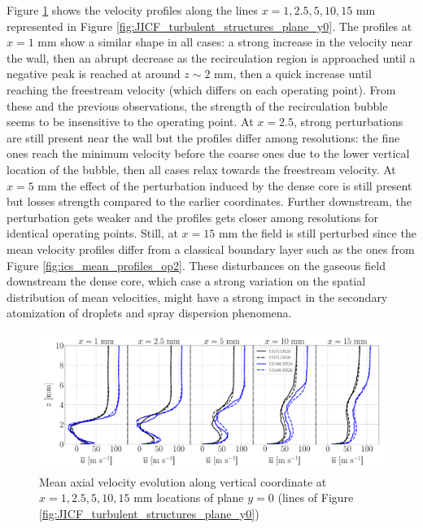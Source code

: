 Figure \ref{fig:JICF_sps_lines_y0_along_z_ux_mean} shows the velocity profiles along the lines $x = 1, 2.5, 5, 10, 15$ mm represented in Figure \ref{fig:JICF_turbulent_structures_plane_y0}. The profiles at $x = 1$ mm show a similar shape in all cases: a strong increase in the velocity near the wall, then an abrupt decrease as the recirculation region is approached until a negative peak is reached at around $z \sim 2$ mm, then a quick increase until reaching the freestream velocity (which differs on each operating point). From these and the previous observations, the strength of the recirculation bubble seems to be insensitive to the operating point. At $x = 2.5$, strong perturbations are still present near the wall but the profiles differ among resolutions: the fine ones reach the minimum velocity before the coarse ones due to the lower vertical location of the bubble, then all cases relax towards the freestream velocity. At $x = 5$ mm the effect of the perturbation induced by the dense core is still present but losses strength compared to the earlier coordinates. Further downstream, the perturbation gets weaker and the profiles gets closer among resolutions for identical operating points. Still, at $x = 15$ mm the field is still perturbed since the mean velocity profiles differ from a classical boundary layer such as the ones from Figure \ref{fig:ics_mean_profiles_op2}. These disturbances on the gaseous field downstream the dense core, which case a strong variation on the spatial distribution of mean velocities, might have a strong impact in the secondary atomization of droplets and spray dispersion phenomena.

\begin{figure}[ht]
\flushleft
   \includegraphics[scale=0.24]{./part2_developments/figures_ch5_resolved_JICF/turbulent_structures/lines_y0_along_z_ux_mean}
\caption{Mean axial velocity evolution along vertical coordinate at $x = 1, 2.5, 5, 10, 15$ mm locations of plane $y = 0$ (lines of Figure \ref{fig:JICF_turbulent_structures_plane_y0})}
\label{fig:JICF_sps_lines_y0_along_z_ux_mean}
\end{figure}



